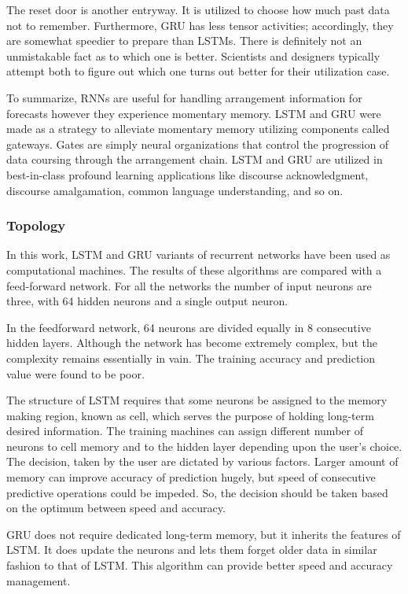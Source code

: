 The reset door is another entryway. It is utilized to choose how much past data not to remember. Furthermore, GRU has less tensor activities; accordingly, they are somewhat speedier to prepare than LSTMs. There is definitely not an unmistakable fact as to which one is better. Scientists and designers typically attempt both to figure out which one turns out better for their utilization case.  

To summarize, RNNs are useful for handling arrangement information for forecasts however they experience momentary memory. LSTM and GRU were made as a strategy to alleviate momentary memory utilizing components called gateways. Gates are simply neural organizations that control the progression of data coursing through the arrangement chain. LSTM and GRU are utilized in best-in-class profound learning applications like discourse acknowledgment, discourse amalgamation, common language understanding, and so on. 

\subsubsection{Topology}

In this work, LSTM and GRU variants of recurrent networks have been used as computational machines. The results of these algorithms are compared with a feed-forward network. For all the networks the number of input neurons are three, with 64 hidden neurons and a single output neuron.  

In the feedforward network, 64 neurons are divided equally in 8 consecutive hidden layers. Although the network has become extremely complex, but the complexity remains essentially in vain. The training accuracy and prediction value were found to be poor. 

The structure of LSTM requires that some neurons be assigned to the memory making region, known as cell, which serves the purpose of holding long-term desired information. The training machines can assign different number of neurons to cell memory and to the hidden layer depending upon the user's choice. The decision, taken by the user are dictated by various factors. Larger amount of memory can improve accuracy of prediction hugely, but speed of consecutive predictive operations could be impeded. So, the decision should be taken based on the optimum between speed and accuracy. 

GRU does not require dedicated long-term memory, but it inherits the features of LSTM. It does update the neurons and lets them forget older data in similar fashion to that of LSTM. This algorithm can provide better speed and accuracy management.  

